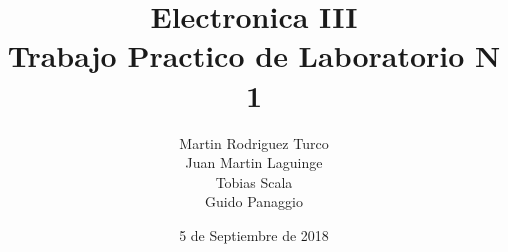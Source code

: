 \documentclass{report} %
\begin{document}
\title{Electronica III \\
Trabajo Practico de Laboratorio N 1}

\author{Martin Rodriguez Turco\\
 Juan Martin Laguinge\\
 Tobias Scala\\
 Guido Panaggio}
\date{5 de Septiembre de 2018}

\maketitle

\end{document}

